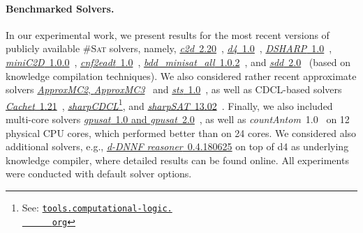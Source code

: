 \documentclass{llncs}
\newcommand{\cSAT}{\textsc{\#Sat}\xspace}%
\newcommand{\WMC}{\textsc{WMC}\xspace}%
\newcommand{\gpusatnu}{{\small\textsf{gpusat2}}\xspace}
\newcommand{\gpusatnuv}[1]{{\small\textsf{gpusat2({\textit{#1}})}}\xspace}
\newcommand{\gpusatone}{{\small\textsf{gpusat1}}\xspace}
\begin{document}
\paragraph{Benchmarked Solvers.}
In our experimental work, we present results for the most recent
versions of publicly available \cSAT solvers, namely,
%
\href{http://reasoning.cs.ucla.edu/c2d/download.php}{\textit{c2d}~2.20}~\cite{Darwiche04a},
\href{http://www.cril.univ-artois.fr/KC/d4.html}{\textit{d4}~1.0}~\cite{LagniezMarquis17a},
\href{https://bitbucket.org/haz/dsharp}{\textit{DSHARP}~1.0}~\cite{MuiseEtAl12a},
\href{http://reasoning.cs.ucla.edu/minic2d/}{\textit{miniC2D}~1.0.0}~\cite{OztokDarwiche15a},
\href{http://www.cril.univ-artois.fr/KC/eadt.html}{\textit{cnf2eadt}~1.0}~\cite{KoricheLagniezMarquisThomas13a}, 
\href{http://www.sd.is.uec.ac.jp/toda/code/cnf2obdd.html}{\textit{bdd\_{}minisat\_\allowbreak{}all}~1.0.2}~\cite{TodaSoh15a},
and \href{http://reasoning.cs.ucla.edu/sdd/}{\textit{sdd}~2.0}~\cite{Darwiche11a} (based on %
knowledge compilation techniques).
%
%
%
%
%
%
%
We also considered rather recent approximate solvers
\href{https://bitbucket.org/kuldeepmeel/approxmc}{\textit{ApproxMC2}, \textit{ApproxMC3}}~\cite{ChakrabortyEtAl14a}
and
\href{http://cs.stanford.edu/~ermon/code/STS.zip}{\textit{sts}~1.0}~\cite{ErmonGomesSelman12a},
%
as well as %
CDCL-based solvers
%
\href{https://www.cs.rochester.edu/u/kautz/Cachet/cachet-wmc-1-21.zip}{\textit{Cachet}~1.21}~\cite{SangEtAl04},
\href{http://tools.computational-logic.org/content/sharpCDCL.php}{\textit{sharpCDCL}}\footnote{See:
  \href{http://tools.computational-logic.
    org/content/sharpCDCL.php}{\nolinkurl{tools.computational-logic.
      org}}}, %
and
\href{https://sites.google.com/site/marcthurley/sharpsat}{\textit{sharpSAT}~13.02}~\cite{Thurley06a}.
%
Finally, we also included multi-core solvers
\href{https://github.com/daajoe/GPUSAT/releases/tag/v0.815-pre}{\textit{gpusat}~1.0 and \textit{gpusat}~2.0}~\cite{FichteEtAl19}, as well as
\textit{countAntom}~1.0~\cite{BurchardSchubertBecker15a} on 12 physical CPU
cores, which performed better than on 24 cores.
%
%
%
%
%
%
%
%
We considered also additional solvers, e.g., %
\href{http://www.cril.univ-artois.fr/kc/ressources/query-dnnf-0.4.180625.zip}{\textit{d-DNNF
    reasoner}~0.4.180625} on top of d4 as underlying knowledge
compiler, where detailed results can be found online. %
All experiments were conducted with default solver options.
%
%
%
%
%
%
%
%
%
\end{document}
